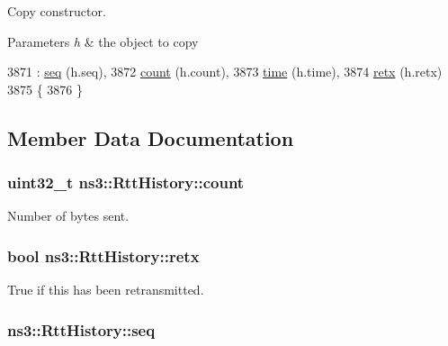 Copy constructor. 


\begin{DoxyParams}{Parameters}
{\em h} & the object to copy \\
\hline
\end{DoxyParams}

\begin{DoxyCode}
3871   : \hyperlink{classns3_1_1RttHistory_accdecbcb32037dd67fb2e048901d5d0f}{seq} (h.seq),
3872     \hyperlink{classns3_1_1RttHistory_a1f5d2dd2d6b30aa89c5f7cd7301ba3a0}{count} (h.count),
3873     \hyperlink{classns3_1_1RttHistory_ab1dedd70854fa8dd017f4c9b10ce4c51}{time} (h.time),
3874     \hyperlink{classns3_1_1RttHistory_aa09a8578166430fa105d30606c56cc5c}{retx} (h.retx)
3875 \{
3876 \}
\end{DoxyCode}


\subsection{Member Data Documentation}
\subsubsection[{\texorpdfstring{count}{count}}]{\setlength{\rightskip}{0pt plus 5cm}uint32\+\_\+t ns3\+::\+Rtt\+History\+::count}\hypertarget{classns3_1_1RttHistory_a1f5d2dd2d6b30aa89c5f7cd7301ba3a0}{}\label{classns3_1_1RttHistory_a1f5d2dd2d6b30aa89c5f7cd7301ba3a0}


Number of bytes sent. 

\subsubsection[{\texorpdfstring{retx}{retx}}]{\setlength{\rightskip}{0pt plus 5cm}bool ns3\+::\+Rtt\+History\+::retx}\hypertarget{classns3_1_1RttHistory_aa09a8578166430fa105d30606c56cc5c}{}\label{classns3_1_1RttHistory_aa09a8578166430fa105d30606c56cc5c}


True if this has been retransmitted. 

\subsubsection[{\texorpdfstring{seq}{seq}}]{ ns3\+::\+Rtt\+History\+::seq}\hypertarget{classns3_1_1RttHistory_accdecbcb32037dd67fb2e048901d5d0f}{}\label{classns3_1_1RttHistory_accdecbcb32037dd67fb2e048901d5d0f}


